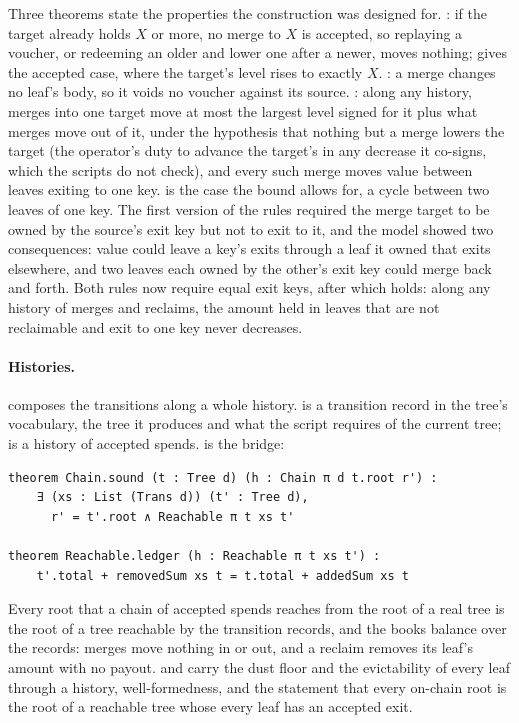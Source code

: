 Three theorems state the properties the construction was designed for.
: if the target already holds $X$ or more, no
merge to $X$ is accepted, so replaying a voucher, or redeeming an older
and lower one after a newer, moves nothing; 
gives the accepted case, where the target's level rises to exactly $X$.
: a merge changes no leaf's body, so it voids
no voucher against its source. : along any
history, merges into one target move at most the largest level signed for
it plus what merges move out of it, under the hypothesis that nothing but
a merge lowers the target (the operator's duty to advance the target's
 in any decrease it co-signs, which the scripts do not check),
and every such merge moves value between leaves exiting to one key.
 is the case the bound allows for, a cycle
between two leaves of one key. The first version of the rules required the
merge target to be owned by the source's exit key but not to exit to it,
and the model showed two consequences: value could leave a key's exits
through a leaf it owned that exits elsewhere, and two leaves each owned by
the other's exit key could merge back and forth. Both rules now require
equal exit keys, after which  holds: along any
history of merges and reclaims, the amount held in leaves that are not
reclaimable and exit to one key never decreases.

\paragraph{Histories.}  composes the transitions along a
whole history.  is a transition record in the tree's
vocabulary,  the tree it produces and 
what the script requires of the current tree;  is a history of
accepted spends.  is the bridge:

\begin{lstlisting}
theorem Chain.sound (t : Tree d) (h : Chain π d t.root r') :
    ∃ (xs : List (Trans d)) (t' : Tree d),
      r' = t'.root ∧ Reachable π t xs t'

theorem Reachable.ledger (h : Reachable π t xs t') :
    t'.total + removedSum xs t = t.total + addedSum xs t
\end{lstlisting}

Every root that a chain of accepted spends reaches from the root of a real
tree is the root of a tree reachable by the transition records, and the
books balance over the records: merges move nothing in or out, and a
reclaim removes its leaf's amount with no payout.  and
 carry the dust floor and the evictability of
every leaf through a history,  well-formedness, and
 the statement that every on-chain root is the root of
a reachable tree whose every leaf has an accepted exit.



